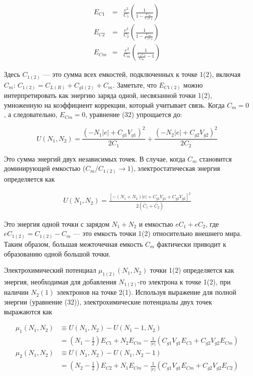 \documentclass[a4paper,14pt]{extarticle}
\begin{document}
\begin{eqnarray}
    E_{C1} &=& \frac{e^2}{C_1} \left( \frac{1}{1 - \frac{C_m}{C_1 C_2}} \right) \\
    E_{C2} &=& \frac{e^2}{C_2} \left( \frac{1}{1 - \frac{C_m}{C_1 C_2}} \right) \\
    E_{Cm} &=& \frac{e^2}{C_m} \left( \frac{1}{\frac{C_1 C_2}{C_m} - 1} \right)
    \end{eqnarray}

Здесь \(C_{1(2)}\) — это сумма всех емкостей, подключенных к точке 1(2), включая \(C_m\): \(C_{1(2)} = C_{L(R)} + C_{g1(2)} + C_m\). Заметьте, что \(E_{C1(2)}\) можно интерпретировать как энергию заряда одной, несвязанной точки 1(2), умноженную на коэффициент коррекции, который учитывает связь. Когда \(C_m = 0\), а следовательно, \(E_{Cm} = 0\), уравнение (32) упрощается до:

\begin{equation}
    U(N_1, N_2) = \frac{(-N_1 |e| + C_{g1} V_{g1})^2}{2 C_1} + \frac{(-N_2 |e| + C_{g2} V_{g2})^2}{2 C_2}
    \end{equation}

Это сумма энергий двух независимых точек. В случае, когда \(C_m\) становится доминирующей емкостью (\(C_m / C_{1(2)} \rightarrow 1\)), электростатическая энергия определяется как

\begin{eqnarray}
    U(N_1, N_2) = \frac{\left[ -(N_1 + N_2)|e| + C_{g1}V_{g1} + C_{g2}V_{g2} \right]^2}{2(\tilde{C_1} + \tilde{C_2})}
    \end{eqnarray}

Это энергия одной точки с зарядом \(N_1 + N_2\) и емкостью \(eC_1 + eC_2\), где \(eC_{1(2)} = C_{1(2)} - C_m\) — это емкость точки 1(2) относительно внешнего мира. Таким образом, большая межточечная емкость \(C_m\) фактически приводит к образованию одной большой точки.

Электрохимический потенциал \(\mu_{1(2)}(N_1, N_2)\) точки 1(2) определяется как энергия, необходимая для добавления \(N_{1(2)}\)-го электрона к точке 1(2), при наличии \(N_2(1)\) электронов на точке 2(1). Используя выражение для полной энергии (уравнение (32)), электрохимические потенциалы двух точек выражаются как \cite{vander}

\begin{align}
    \mu_1(N_1, N_2) &\equiv U(N_1, N_2) - U(N_1 - 1, N_2) \nonumber \\
    &= \left( N_1 - \frac{1}{2} \right) E_{C1} + N_2 E_{Cm} - \frac{1}{|e|} \left( C_{g1} V_{g1} E_{C1} + C_{g2} V_{g2} E_{Cm} \right) \tag{39} \\[10pt]
    \mu_2(N_1, N_2) &\equiv U(N_1, N_2) - U(N_1, N_2 - 1) \nonumber \\
    &= \left( N_2 - \frac{1}{2} \right) E_{C2} + N_1 E_{Cm} - \frac{1}{|e|} \left( C_{g1} V_{g1} E_{Cm} + C_{g2} V_{g2} E_{C2} \right) \tag{40}
    \end{align}
\end{document}
